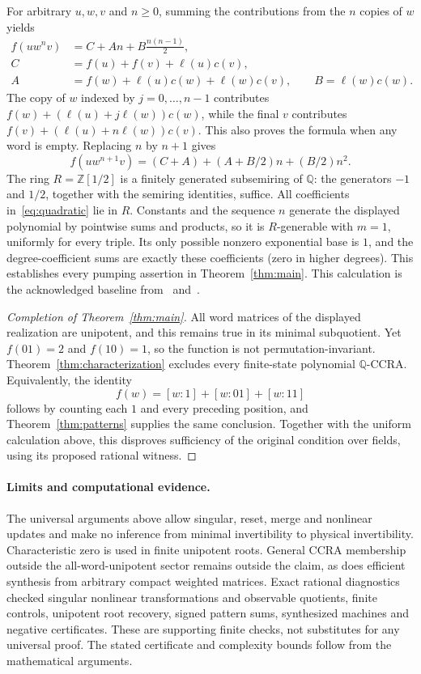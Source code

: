 \documentclass[acmlarge,screen,11pt,nonacm]{acmart}
\newcommand{\Q}{\mathbb{Q}}
\newcommand{\Z}{\mathbb{Z}}
\theoremstyle{definition}
\begin{document}
For arbitrary $u,w,v$ and $n\geq0$, summing the contributions from the $n$ copies of $w$ yields
\begin{align*}
 f(uw^n v)&=C+An+B\frac{n(n-1)}2,\\
 C&=f(u)+f(v)+\ell(u)c(v),\\
 A&=f(w)+\ell(u)c(w)+\ell(w)c(v),\qquad B=\ell(w)c(w).
\end{align*}
The copy of $w$ indexed by $j=0,\ldots,n-1$ contributes $f(w)+(\ell(u)+j\ell(w))c(w)$, while the final $v$ contributes $f(v)+(\ell(u)+n\ell(w))c(v)$. This also proves the formula when any word is empty. Replacing $n$ by $n+1$ gives
\begin{equation}\label{eq:quadratic}
 f(uw^{n+1}v)=(C+A)+(A+B/2)n+(B/2)n^2.
\end{equation}
The ring $R=\Z[1/2]$ is a finitely generated subsemiring of $\Q$: the generators $-1$ and $1/2$, together with the semiring identities, suffice. All coefficients in~\eqref{eq:quadratic} lie in $R$. Constants and the sequence $n$ generate the displayed polynomial by pointwise sums and products, so it is $R$-generable with $m=1$, uniformly for every triple. Its only possible nonzero exponential base is $1$, and the degree-coefficient sums are exactly these coefficients (zero in higher degrees). This establishes every pumping assertion in Theorem~\ref{thm:main}. This calculation is the acknowledged baseline from~\cite[Example~26]{MPS26} and~\cite[Appendix~B.4]{MPSfull}.


\begin{proof}[Completion of Theorem~\ref{thm:main}]
All word matrices of the displayed realization are unipotent, and this remains true in its minimal subquotient. Yet $f(01)=2$ and $f(10)=1$, so the function is not permutation-invariant. Theorem~\ref{thm:characterization} excludes every finite-state polynomial $\Q$-CCRA. Equivalently, the identity
\[
 f(w)=[w:1]+[w:01]+[w:11]
\]
follows by counting each $1$ and every preceding position, and Theorem~\ref{thm:patterns} supplies the same conclusion. Together with the uniform calculation above, this disproves sufficiency of the original condition over fields, using its proposed rational witness.
\end{proof}

\paragraph{Limits and computational evidence.}
The universal arguments above allow singular, reset, merge and nonlinear updates and make no inference from minimal invertibility to physical invertibility. Characteristic zero is used in finite unipotent roots. General CCRA membership outside the all-word-unipotent sector remains outside the claim, as does efficient synthesis from arbitrary compact weighted matrices. Exact rational diagnostics checked singular nonlinear transformations and observable quotients, finite controls, unipotent root recovery, signed pattern sums, synthesized machines and negative certificates. These are supporting finite checks, not substitutes for any universal proof. The stated certificate and complexity bounds follow from the mathematical arguments.
\end{document}
